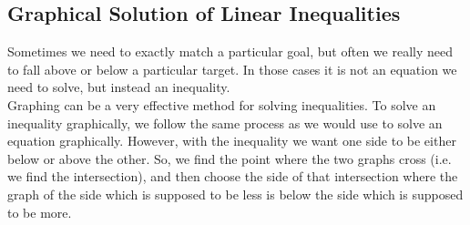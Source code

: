 
%
%

\subsection{Graphical Solution of Linear Inequalities}

Sometimes we need to exactly match a particular goal, but often we really need to fall above or below a particular target. In those cases it is not an equation we need to solve, but instead an
inequality.\\

Graphing can be a very effective method for solving inequalities. To solve an inequality graphically, we follow the same process as we would use to solve an equation graphically. However, with the
inequality we want one side to be either below or above the other. So, we find the point where the two graphs cross (i.e. we find the intersection), and then choose the side of that intersection where
the graph of the side which is supposed to be less is below the side which is supposed to be more.\\

